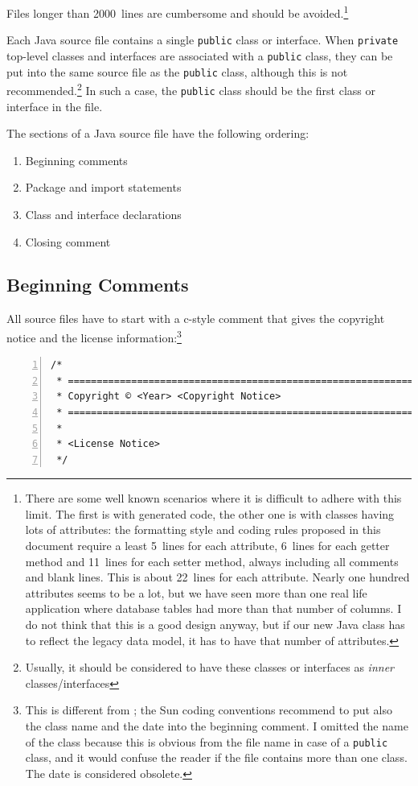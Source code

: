 \documentclass[12pt,a4paper,titlepage, parskip=half, headsepline, footsepline, cleardoubleplain]{scrbook}
\begin{document}
Files longer than 2000~lines are cumbersome and should be avoided.\footnote{There are some well known scenarios where it is difficult to adhere with this limit. The first is with generated code, the other one is with classes having lots of attributes: the formatting style and coding rules proposed in this document require a least 5~lines for each attribute, 6~lines for each getter method and 11~lines for each setter method, always including all comments and blank lines. This is about 22~lines for each attribute. Nearly one hundred attributes seems to be a lot, but we have seen more than one real life application where database tables had more than that number of columns. I do not think that this is a good design anyway, but if our new Java class has to reflect the legacy data model, it has to have that number of attributes.}

Each Java source file contains a single \lstinline|public| class or interface. When \lstinline|private| top-level classes and interfaces are associated with a \lstinline|public| class, they can be put into the same source file as the \lstinline|public| class, although this is not recommended.\footnote{Usually, it should be considered to have these classes or interfaces as \textit{inner} classes/interfaces} In such a case, the \lstinline|public| class should be the first class or interface in the file.

The sections of a Java source file have the following ordering:

\begin{enumerate}[nosep]
\item{Beginning comments}
\item{Package and import statements}
\item{Class and interface declarations}
\item{Closing comment}
\end{enumerate}

\subsection{Beginning Comments}\label{sec:BeginningComments}
All source files have to start with a c-style comment that gives the copyright notice and the license information:\footnote{This is different from \autocite{SUN_CODE_CONVENTIONS:BeginningComments}; the Sun coding conventions recommend to put also the class name and the date into the beginning comment. I omitted the name of the class because this is obvious from the file name in case of a \lstinline|public| class, and it would confuse the reader if the file contains more than one class. The date is considered obsolete.}
\begin{lstlisting}[numbers=left,caption={Beginning Comment}]
/*
 * ==================================================================
 * Copyright © <Year> <Copyright Notice>
 * ==================================================================
 *
 * <License Notice>
 */
\end{lstlisting}
 
\end{document}
